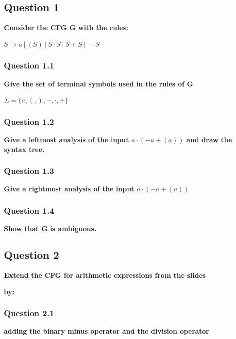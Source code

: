 \subsection{Question 1}
    \textbf{Consider the CFG G with the rules:}
    \begin{center}
        $S \rightarrow a \ | \ (S) \ | \ S \cdot S \ | \ S + S \ | \ -S $
    \end{center}
    \subsubsection{Question 1.1}
        \textbf{Give the set of terminal symbols used in the rules of G} \\

        \begin{center}
            $\Sigma = \{a, (, ), -, \cdot, +\}$
        \end{center}
    \subsubsection{Question 1.2}
        \textbf{Give a leftmost analysis of the input $a \cdot (-a + (a))$ and draw the syntax tree.} \\

        

    \subsubsection{Question 1.3}
        \textbf{Give a rightmost analysis of the input $a \cdot (-a + (a))$}

        

    \subsubsection{Question 1.4}
        \textbf{Show that G is ambiguous.}

        

\subsection{Question 2}
    \textbf{Extend the CFG for arithmetic expressions from the slides}

    

    \textbf{by:}

    \subsubsection{Question 2.1}
        \textbf{adding the binary minus operator and the division operator}

